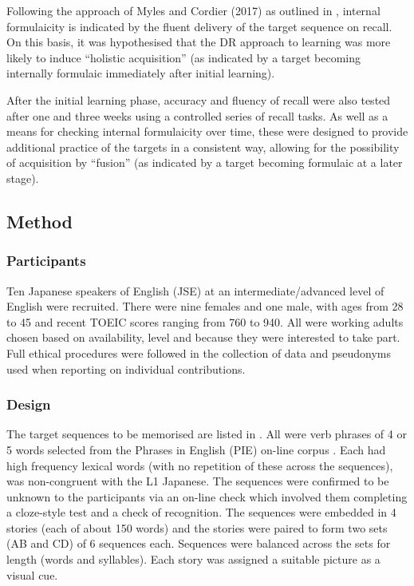 \documentclass[output=paper]{langscibook}
\begin{document}
Following the approach of Myles and Cordier (2017) as outlined in , internal formulaicity is indicated by the fluent delivery of the target sequence on recall. On this basis, it was hypothesised that the DR approach to learning was more likely to induce  ``holistic acquisition'' (as indicated by a target becoming internally formulaic immediately after initial learning).

After the initial learning phase, accuracy and fluency of recall were also tested after one and three weeks using a controlled series of recall tasks. As well as a means for checking internal formulaicity over time, these were designed to provide additional practice of the targets in a consistent way, allowing for the possibility of acquisition by ``fusion'' (as indicated by a target becoming formulaic at a later stage). 

\subsection{Method}
\subsubsection{Participants}

Ten Japanese speakers of English (JSE) at an intermediate/advanced level of English were recruited. There were nine females and one male, with ages from 28 to 45 and recent TOEIC scores \citep{ETS2019} ranging from 760 to 940. All were working adults chosen based on availability, level and because they were interested to take part. Full ethical procedures were followed in the collection of data and pseudonyms used when reporting on individual contributions. 

\subsubsection{Design}

The target sequences to be memorised are listed in . All were verb phrases of 4 or 5 words selected from the Phrases in English (PIE) on-line corpus \citep{Fletcher2011}. Each had high frequency lexical words (with no repetition of these across the sequences), was non-congruent with the L1 Japanese. The sequences were confirmed to be unknown to the participants via an on-line check which involved them completing a cloze-style test and a check of recognition. The sequences were embedded in 4 stories (each of about 150 words) and the stories were paired to form two sets (AB and CD) of 6 sequences each. Sequences were balanced across the sets for length (words and syllables). Each story was assigned a suitable picture as a visual cue.
\end{document}
